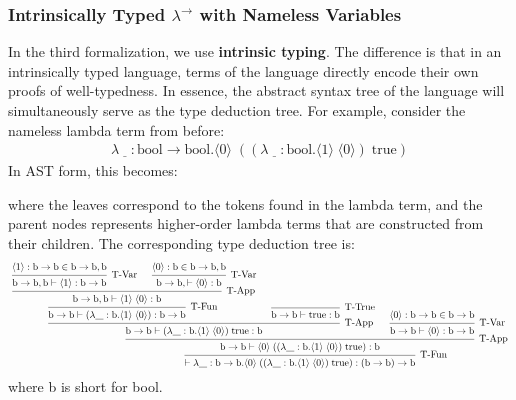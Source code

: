 \documentclass[12pt, letterpaper]{article}
\begin{document}
\subsubsection{Intrinsically Typed $\lambda^{\to}$ with Nameless Variables}
In the third formalization, we use \textbf{intrinsic typing}. The difference is that in an intrinsically typed language, terms of the language directly encode their own proofs of well-typedness. In essence, the abstract syntax tree of the language will simultaneously serve as the type deduction tree. For example, consider the nameless lambda term from before:
\begin{align*}
\lambda \underline{\;\;\;} : \text{bool} \to \text{bool} . \langle 0 \rangle\;((\lambda \underline{\;\;\;} : \text{bool} . \langle 1 \rangle\;\langle 0 \rangle)\;\text{true})
\end{align*}
In AST form, this becomes:
\begin{center}
\end{center}
where the leaves correspond to the tokens found in the lambda term, and the parent nodes represents higher-order lambda terms that are constructed from their children. The corresponding type deduction tree is:
\[
\scalebox{0.8}{
\begin{prooftree}
\hypo{\langle 1 \rangle : \text{b} \to \text{b} \in \text{b} \to \text{b}, \text{b}}
\infer1[T-Var]{\text{b} \to \text{b}, \text{b} \vdash \langle 1 \rangle : \text{b} \to \text{b}}
\hypo{\langle 0 \rangle : \text{b} \in \text{b} \to \text{b}, \text{b}}
\infer1[T-Var]{\text{b} \to \text{b},  \vdash \langle 0 \rangle : \text{b}}
\infer2[T-App]{\text{b} \to \text{b}, \text{b} \vdash \langle 1 \rangle\;\langle 0 \rangle : \text{b}}
\infer1[T-Fun]{\text{b} \to \text{b} \vdash (\lambda \underline{\;\;\;} : \text{b} . \langle 1 \rangle\;\langle 0 \rangle) : \text{b} \to \text{b}}
\infer0[T-True]{\text{b} \to \text{b} \vdash \text{true} : \text{b}}
\infer2[T-App]{\text{b} \to \text{b} \vdash (\lambda \underline{\;\;\;} : \text{b} . \langle 1 \rangle\;\langle 0 \rangle)\;\text{true} : \text{b}}
\hypo{\langle 0 \rangle : \text{b} \to \text{b} \in \text{b} \to \text{b}}
\infer1[T-Var]{\text{b} \to \text{b} \vdash \langle 0 \rangle : \text{b} \to \text{b}}
\infer2[T-App]{\text{b} \to \text{b} \vdash \langle 0 \rangle\;((\lambda \underline{\;\;\;} : \text{b} . \langle 1 \rangle\;\langle 0 \rangle)\;\text{true}) : \text{b}}
\infer1[T-Fun]{\vdash \lambda \underline{\;\;\;} : \text{b} \to \text{b} . \langle 0 \rangle\;((\lambda \underline{\;\;\;} : \text{b} . \langle 1 \rangle\;\langle 0 \rangle)\;\text{true}) : (\text{b} \to \text{b}) \to \text{b}}
\end{prooftree}
}
\]
where b is short for bool.
\end{document}
